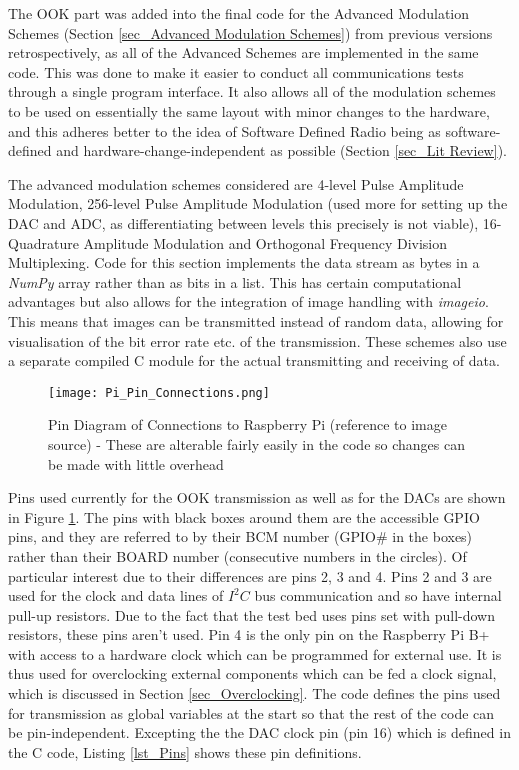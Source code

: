 \documentclass[../main.tex]{subfiles}
\begin{document}
The OOK part was added into the final code for the Advanced Modulation Schemes (Section \ref{sec_Advanced Modulation Schemes})  from previous versions retrospectively, as all of the Advanced Schemes are implemented in the same code.
This was done to make it easier to conduct all communications tests through a single program interface.
It also allows all of the modulation schemes to be used on essentially the same layout with minor changes to the hardware, and this adheres better to the idea of Software Defined Radio being as software-defined and hardware-change-independent as possible (Section \ref{sec_Lit Review}).\\

The advanced modulation schemes considered are 4-level Pulse Amplitude Modulation, 256-level Pulse Amplitude Modulation (used more for setting up the DAC and ADC, as differentiating between levels this precisely is not viable), 16-Quadrature Amplitude Modulation and Orthogonal Frequency Division Multiplexing.
Code for this section implements the data stream as bytes in a \textit{NumPy} array rather than as bits in a list.
This has certain computational advantages but also allows for the integration of image handling with \textit{imageio}.
This means that images can be transmitted instead of random data, allowing for visualisation of the bit error rate etc. of the transmission.
These schemes also use a separate compiled C module for the actual transmitting and receiving of data.\\

\begin{figure}[ht]
 	\centering
 	\texttt{[image: Pi\_Pin\_Connections.png]}
 	\caption{Pin Diagram of Connections to Raspberry Pi (reference to image source) - These are alterable fairly easily in the code so changes can be made with little overhead}
 	\label{fig_Pin Connections}
\end{figure}

Pins used currently for the OOK transmission as well as for the DACs are shown in Figure \ref{fig_Pin Connections}.
The pins with black boxes around them are the accessible GPIO pins, and they are referred to by their BCM number (GPIO\# in the boxes) rather than their BOARD number (consecutive numbers in the circles).
Of particular interest due to their differences are pins 2, 3 and 4.
Pins 2 and 3 are used for the clock and data lines of $I^2C$ bus communication and so have internal pull-up resistors.
Due to the fact that the test bed uses pins set with pull-down resistors, these pins aren't used.
Pin 4 is the only pin on the Raspberry Pi B+ with access to a hardware clock which can be programmed for external use.
It is thus used for overclocking external components which can be fed a clock signal, which is discussed in Section \ref{sec_Overclocking}.
The code defines the pins used for transmission as global variables at the start so that the rest of the code can be pin-independent.
Excepting the the DAC clock pin (pin 16) which is defined in the C code, Listing \ref{lst_Pins} shows these pin definitions.\\
\end{document}
